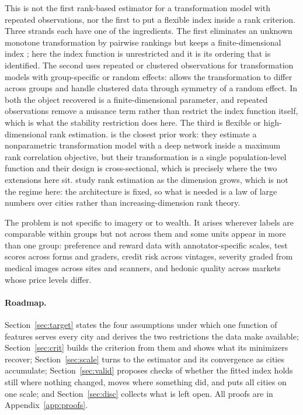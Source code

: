 \documentclass[11pt]{article}
\theoremstyle{remark}
\begin{document}
This is not the first rank-based estimator for a transformation model with repeated observations, nor
the first to put a flexible index inside a rank criterion. Three strands each have one of the
ingredients. The first eliminates an unknown monotone transformation by pairwise rankings but keeps a
finite-dimensional index \citep{han1987, sherman1993, cavanagh1998}; here the index function is
unrestricted and it is its ordering that is identified. The second uses repeated or clustered
observations for transformation models with group-specific or random effects: \citet{abrevaya2000}
allows the transformation to differ across groups and \citet{lin2017} handle clustered data through
symmetry of a random effect. In both the object recovered is a finite-dimensional parameter, and
repeated observations remove a nuisance term rather than restrict the index function itself, which is
what the stability restriction does here. The third is flexible or high-dimensional rank estimation.
\citet{wang2024deep} is the closest prior work: they estimate a nonparametric transformation model with
a deep network inside a maximum rank correlation objective, but their transformation is a single
population-level function and their design is cross-sectional, which is precisely where the two
extensions here sit. \citet{fan2020rank} study rank estimation as the dimension grows, which is not the
regime here: the architecture is fixed, so what is needed is a law of large numbers over cities rather
than increasing-dimension rank theory.

The problem is not specific to imagery or to wealth. It arises wherever labels are comparable within
groups but not across them and some units appear in more than one group: preference and reward data
with annotator-specific scales, test scores across forms and graders, credit risk across vintages,
severity graded from medical images across sites and scanners, and hedonic quality across markets whose
price levels differ.

\paragraph{Roadmap.} Section~\ref{sec:target} states the four assumptions under which one function of
features serves every city and derives the two restrictions the data make available;
Section~\ref{sec:crit} builds the criterion from them and shows what its minimizers recover;
Section~\ref{sec:scale} turns to the estimator and its convergence as cities accumulate;
Section~\ref{sec:valid} proposes checks of whether the fitted index holds still where nothing changed,
moves where something did, and puts all cities on one scale; and Section~\ref{sec:disc} collects what is
left open. All proofs are in Appendix~\ref{app:proofs}.
\end{document}
